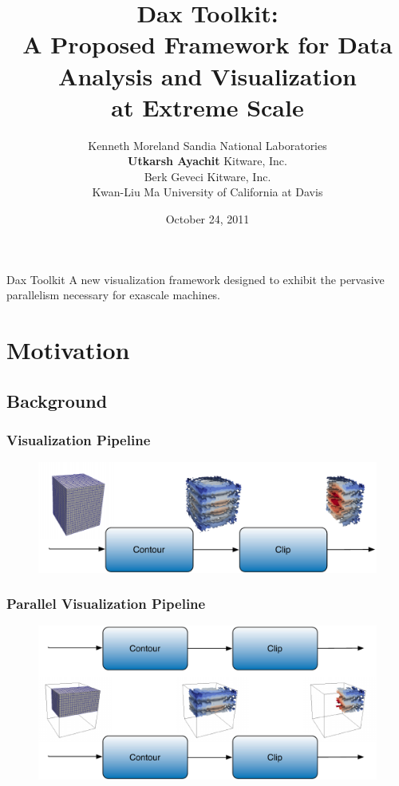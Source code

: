 \documentclass[brown]{beamer}
\title{\textbf{Dax Toolkit}: \\
  A Proposed Framework for Data Analysis and Visualization \\
  at Extreme Scale}
\author{\small
  Kenneth Moreland {\tiny Sandia National Laboratories} \\
  \textbf{Utkarsh Ayachit} {\tiny Kitware, Inc. } \\
  Berk Geveci {\tiny Kitware, Inc. }\\
  Kwan-Liu Ma {\tiny University of California at Davis}
}
\date {October 24, 2011}
\begin{document}
\frame{\titlepage}

\frame
{
  \begin{beamerboxesrounded}{Dax Toolkit}
  A new visualization framework designed to exhibit the pervasive parallelism
    necessary for exascale machines.
  \end{beamerboxesrounded}
}

\section{Motivation}
\subsection{Background}

\frame
{
  \frametitle{Visualization Pipeline}
  \begin{figure}
  \centering
  \includegraphics[width=.8\textwidth]{images/SimplePipeline.pdf}
  \end{figure}
}

\frame
{
  \frametitle{Parallel Visualization Pipeline}
  \begin{figure}
  \centering
  \includegraphics[width=.8\textwidth]{images/ParallelVisPipeline.pdf}
  \end{figure}
}
\end{document}
